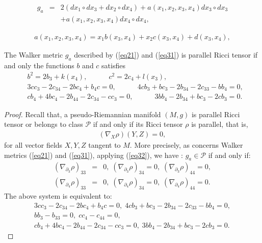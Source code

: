 \documentclass[10pt,a4paper]{amsart}
\begin{document}
\begin{eqnarray}\label{eq21} 
g_{a} & = & 2(dx_1\circ dx_3 + dx_2 \circ dx_4 ) 
+ a(x_1,x_2,x_3,x_4)dx_3\circ dx_3\nonumber\\
&& + a(x_1,x_2,x_3,x_4)dx_4 \circ dx_4 ,
\end{eqnarray}

\begin{eqnarray}\label{eq31}
a(x_1,x_2,x_3,x_4)=x_1b(x_3,x_4) + x_2c(x_3,x_4) + d(x_3,x_4),
\end{eqnarray}

 \begin{theorem}
The Walker metric $g_a$ described by (\ref{eq21}) and (\ref{eq31})
is parallel Ricci tensor if and only the functions $b$ and $c$ satisfies
\begin{eqnarray*}
& b^2 = 2b_3+k(x_4),\quad \quad \quad 
c^2=2c_4+l(x_3), \\
& 3cc_3-2c_{34}-2bc_4+b_4c = 0, \quad \quad \quad  
4cb_3 + bc_{3} - 2b_{34} - 2c_{33} - bb_4 = 0, \\
& cb_4 + 4bc_4 - 2b_{44} - 2c_{34} - cc_3 = 0, \quad \quad \quad 
3bb_4 - 2b_{34} + bc_3 - 2cb_3 = 0.
\end{eqnarray*}
\end{theorem}

\begin{proof}
Recall that, a pseudo-Riemannian manifold $(M,g)$ is parallel Ricci tensor 
or belongs to class $\mathcal{P}$ if and only if its Ricci tensor $\rho$ is parallel, that is,
\begin{eqnarray}\label{eq32}
 (\nabla_X \rho)(Y,Z) = 0,
 \end{eqnarray}
for all vector fields $X,Y,Z$ tangent to $M$. More precisely, as concerns  Walker metrics (\ref{eq21}) and (\ref{eq31}), applying (\ref{eq32}), we 
have : $g_a\in \mathcal{P}$ if and only if:
 \begin{eqnarray*}
(\nabla_{\partial_3}\rho)_{33} &=& 0, \;
(\nabla_{\partial_3}\rho)_{34} = 0, \; 
(\nabla_{\partial_3}\rho)_{44} = 0 ,\\
(\nabla_{\partial_4}\rho)_{33} &=& 0, \; 
(\nabla_{\partial_4}\rho)_{34} = 0, \; 
(\nabla_{\partial_4}\rho)_{44} = 0.
 \end{eqnarray*}
The above system  is equivalent to:
\begin{eqnarray*}
3cc_3 - 2c_{34} - 2bc_4 + b_4c = 0, \;
4cb_3 + bc_{3} - 2b_{34} - 2c_{33} - bb_4 =0 , \\
bb_3 - b_{33} = 0,\; cc_4 - c_{44} = 0 , \\
cb_4 + 4bc_4 - 2b_{44} - 2c_{34} - cc_3 =0, \;
3bb_4 - 2b_{34} + bc_3 - 2cb_3 =0 .
\end{eqnarray*}
\end{proof}
\end{document}
